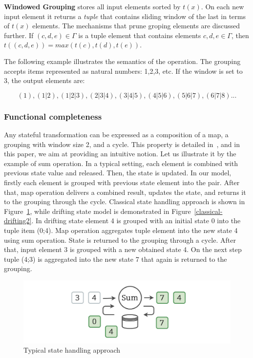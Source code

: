 {\bf Windowed Grouping} stores all input elements sorted by $t(x)$. On each new input element it returns a {\em tuple} that contains sliding window of the last in terms of $t(x)$ elements. The mechanisms that prune groping elements are discussed further. If $(c,d,e)\in \Gamma$ is a tuple element that contains elements $c,d,e \in \Gamma$, then $t((c,d,e))=max(t(c),t(d),t(e))$. 

The following example illustrates the semantics of the operation. The grouping accepts items represented as natural numbers: 1,2,3, etc. If the window is set to 3, the output elements are:

\[(1), (1|2), (1|2|3), (2|3|4), (3|4|5), (4|5|6), (5|6|7), (6|7|8)...\]

\subsubsection{Functional completeness}

Any stateful transformation can be expressed as a composition of a map, a grouping with window size 2, and a cycle. This property is detailed in~\cite{we2018adbis}, and in this paper, we aim at providing an intuitive notion. Let us illustrate it by the example of sum operation. In a typical setting, each element is combined with previous state value and released. Then, the state is updated. In our model, firstly each element is grouped with previous state element into the pair. After that, map operation delivers a combined result, updates the state, and returns it to the grouping through the cycle. Classical state handling approach is shown in Figure~\ref{classical-drifting}, while drifting state model is demonstrated in Figure~\ref{classical-drifting2}. In drifting state element 4 is grouped with an initial state 0 into the tuple item (0;4). Map operation aggregates tuple element into the new state 4 using sum operation. State is returned to the grouping through a cycle. After that, input element 3 is grouped with a new obtained state 4. On the next step tuple (4;3) is aggregated into the new state 7 that again is returned to the grouping.   

\begin{figure}[htbp]
  \centering
  \includegraphics[width=\columnwidth]{pics/classical-drifting}
  \caption{Typical state handling approach}
  \label {classical-drifting}
\end{figure}

